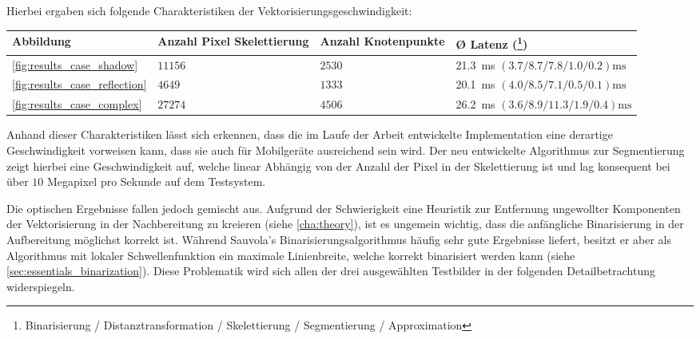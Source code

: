 Hierbei ergaben sich folgende Charakteristiken der Vektorisierungsgeschwindigkeit\systemfootnote{}:

\begin{tabu}{X|X|X|X[2]}
    Abbildung & Anzahl Pixel \newline Skelettierung & Anzahl \newline Knotenpunkte & Ø Latenz \newline (\footnote{Binarisierung / Distanztransformation / Skelettierung / Segmentierung / Approximation}) \\
    \midrule
    \autoref{fig:results_case_shadow} & \(11156\) & \(2530\) & \SI{21.3}{\milli\second} \newline \((\num{3.7}/\num{8.7}/\num{7.8}/\num{1.0}/\num{0.2})\si{\milli\second}\) \\
    \autoref{fig:results_case_reflection} & \(4649\) & \(1333\) & \SI{20.1}{\milli\second} \newline \((\num{4.0}/\num{8.5}/\num{7.1}/\num{0.5}/\num{0.1})\si{\milli\second}\) \\
    \autoref{fig:results_case_complex} & \(27274\) & \(4506\) & \SI{26.2}{\milli\second} \newline \((\num{3.6}/\num{8.9}/\num{11.3}/\num{1.9}/\num{0.4})\si{\milli\second}\)
\end{tabu}

\mbox{}

Anhand dieser Charakteristiken lässt sich erkennen, dass die im Laufe der Arbeit entwickelte Implementation eine derartige Geschwindigkeit vorweisen kann, dass sie auch für Mobilgeräte ausreichend sein wird.
Der neu entwickelte Algorithmus zur Segmentierung zeigt hierbei eine Geschwindigkeit auf, welche linear Abhängig von der Anzahl der Pixel in der Skelettierung ist und lag konsequent bei über \(10\) Megapixel pro Sekunde auf dem Testsystem.

Die optischen Ergebnisse fallen jedoch gemischt aus.
Aufgrund der Schwierigkeit eine Heuristik zur Entfernung ungewollter Komponenten der Vektorisierung in der Nachbereitung zu kreieren (siehe \autoref{cha:theory}), ist es ungemein wichtig, dass die anfängliche Binarisierung in der Aufbereitung möglichst korrekt ist.
Während Sauvola's Binarisierungsalgorithmus häufig sehr gute Ergebnisse liefert, besitzt er aber als Algorithmus mit lokaler Schwellenfunktion ein maximale Linienbreite, welche korrekt binarisiert werden kann (siehe \autoref{sec:essentials_binarization}).
Diese Problematik wird sich allen der drei ausgewählten Testbilder in der folgenden Detailbetrachtung widerspiegeln.

